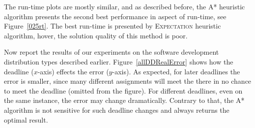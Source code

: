 \documentclass[letterpaper]{article} %
\newcommand{\commentout}[1]{}
\newcommand{\astar}{\textsc{A*}\xspace}
\newcommand{\sampling}{\textsc{Sampling}\xspace}
\newcommand{\expectation}{\textsc{Expectation}\xspace}
\newcommand\Roni[1]{\nb{\textbf{Roni:}}{blue}{#1}}
\begin{document}
The run-time plots are mostly similar, and as described before, the \astar heuristic algorithm presents the second best performance in aspect of run-time, see Figure~\ref{025rt}.
The best run-time is presented by \expectation heuristic algorithm, hover, the solution quality of this method is poor.


\commentout{
\begin{figure}[h!]
	\scriptsize
	\begin{tikzpicture}
	\begin{axis}[
	scale=0.7,
	ymode = log,
	xlabel={\#Layers},
	ylabel near ticks,
	ylabel={Runtime (sec)},
	xmin=4, xmax=8,
	ymin=0, ymax=452,
	legend pos=outer north east,
	ymajorgrids=true,
	grid style=dashed,
	]

	\addplot[
	color=blue,
	mark=x,
	]
	coordinates {
		(4 , 0.08)
		(5 , 0.7)
		(6 , 6.16)
		(7 , 47.67)
		(8 , 452)

	};
	\addlegendentry{BF}

	\addplot[
	color=gray,
	mark=x,
	]
	coordinates {
		(4 , 0.11)
		(5 , 0.25)
		(6 , 0.8)
		(7 , 3.1)
		(8 , 16.1)

	};
	\addlegendentry{\astar}


		\addplot[
	color=green,
	mark=o,
	]
	coordinates {
		(4 , 0.13)
		(5 , 0.53)
		(6 , 2.37)
		(7 , 9)
		(8 , 43)

	};
	\addlegendentry{\sampling}

	\addplot[
	color=red,
	mark=square,
	]
	coordinates {
		(4 , 0.001)
		(5 , 0.005)
		(6 , 0.02)
		(7 , 0.09)
		(8 , 0.4)

	};
	\addlegendentry{\expectation}

	\end{axis}
	\end{tikzpicture}
	\caption{Run time comparison of all heuristic algorithms for deadline of size $0.25\cdot maxd$ and ``Failure" distribution}\label{025failrt}
\end{figure}
}


Now  report the results of our experiments on the software development distribution types described earlier.
Figure~\ref{allDDRealError} shows how the deadline ($x$-axis) effects the error ($y$-axis).
As expected, for later deadlines the error is smaller, since many different assignments will meet the  there in no chance to meet the deadline (omitted from the figure). For different deadlines, even on the same instance, the error may change dramatically. Contrary to that, the \astar algorithm is not sensitive for such deadline changes and always returns the optimal result.
\end{document}
